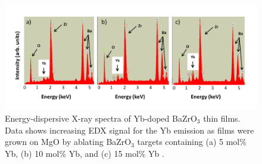 \begin{figure}
    \centering
    \includegraphics[width=\linewidth]{Figures/EDX_Yb.pdf}
    \caption{Energy-dispersive X-ray spectra of Yb-doped BaZrO$_3$ thin films. Data shows increasing EDX signal for the Yb emission as films were grown on MgO by ablating BaZrO$_3$ targets containing (a) 5 mol\% Yb, (b) 10 mol\% Yb, and (c) 15 mol\% Yb \cite{ECamata2012}.}
    \label{fig:EDX:Yb}
\end{figure}

